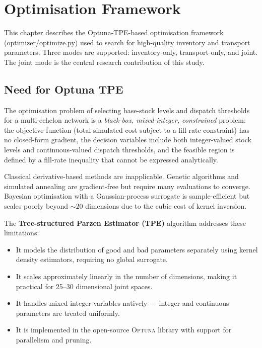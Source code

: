 \chapter{Optimisation Framework}
\label{chap:optimization}

This chapter describes the Optuna-TPE-based optimisation framework
(optimizer/optimize.py) used to search for high-quality inventory
and transport parameters.  Three modes are supported: inventory-only,
transport-only, and joint.  The joint mode is the central research
contribution of this study.

\section{Need for Optuna TPE}
\label{sec:opt:tpe}

The optimisation problem of selecting base-stock levels and dispatch
thresholds for a multi-echelon network is a \emph{black-box, mixed-integer,
constrained} problem: the objective function (total simulated cost subject
to a fill-rate constraint) has no closed-form gradient, the decision
variables include both integer-valued stock levels and continuous-valued
dispatch thresholds, and the feasible region is defined by a fill-rate
inequality that cannot be expressed analytically.

Classical derivative-based methods are inapplicable.  Genetic algorithms
and simulated annealing are gradient-free but require many evaluations to
converge.  Bayesian optimisation with a Gaussian-process surrogate is
sample-efficient but scales poorly beyond $\sim\!20$ dimensions due to
the cubic cost of kernel inversion.

The \textbf{Tree-structured Parzen Estimator (TPE)} algorithm addresses these limitations:
\begin{itemize}
  \item It models the distribution of good and bad parameters separately
        using kernel density estimators, requiring no global surrogate.
  \item It scales approximately linearly in the number of dimensions,
        making it practical for 25--30 dimensional joint spaces.
  \item It handles mixed-integer variables natively — integer and
        continuous parameters are treated uniformly.
  \item It is implemented in the open-source \textsc{Optuna} library
        with support for parallelism and pruning.
\end{itemize}

